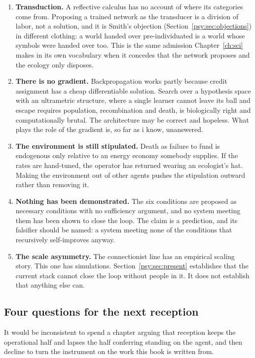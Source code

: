 \begin{enumerate}[label=(\alph*),leftmargin=2.2em,itemsep=0.2em]
\item \textbf{Transduction.}
A reflective calculus has no account of where its categories come
from.
Proposing a trained network as the transducer is a division of
labor, not a solution, and it is Smith's objection
(Section~\ref{psy:sec:objections}) in different clothing: a world
handed over pre-individuated is a world whose symbols were handed
over too.
This is the same admission Chapter~\ref{ch:sci} makes in its own
vocabulary when it concedes that the network proposes and the
ecology only disposes.
\item \textbf{There is no gradient.}
Backpropagation works partly because credit assignment has a cheap
differentiable solution.
Search over a hypothesis space with an ultrametric structure, where
a single learner cannot leave its ball and escape requires
population, recombination and death, is biologically right and
computationally brutal.
The architecture may be correct and hopeless.
What plays the role of the gradient is, so far as i know,
unanswered.
\item \textbf{The environment is still stipulated.}
Death as failure to fund is endogenous only relative to an energy
economy somebody supplies.
If the rates are hand-tuned, the operator has returned wearing an
ecologist's hat.
Making the environment out of other agents pushes the stipulation
outward rather than removing it.
\item \textbf{Nothing has been demonstrated.}
The six conditions are proposed as necessary conditions with no
sufficiency argument, and no system meeting them has been shown to
close the loop.
The claim is a prediction, and its falsifier should be named: a
system meeting none of the conditions that recursively
self-improves anyway.
\item \textbf{The scale asymmetry.}
The connectionist line has an empirical scaling story.
This one has simulations.
Section~\ref{psy:sec:present} establishes that the current stack
cannot close the loop without people in it.
It does not establish that anything else can.
\end{enumerate}

\subsection{Four questions for the next reception}
\label{psy:sec:questions}

It would be inconsistent to spend a chapter arguing that reception
keeps the operational half and lapses the half conferring standing
on the agent, and then decline to turn the instrument on the work
this book is written from.

